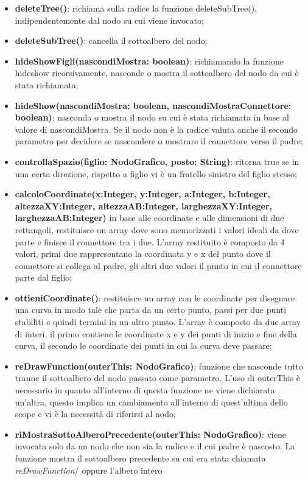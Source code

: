 \begin{itemize}
\item \textbf{deleteTree()}: richiama sulla radice la funzione deleteSubTree(), indipendentemente dal nodo su cui viene invocato;
\item \textbf{deleteSubTree()}: cancella il sottoalbero del nodo;
\item \textbf{hideShowFigli(nascondiMostra: boolean)}: richiamando la funzione hideshow ricorsivamente, nasconde o mostra il sottoalbero del nodo da cui è stata richiamata;
\item \textbf{hideShow(nascondiMostra: boolean, nascondiMostraConnettore: boolean)}: nasconda o mostra il nodo su cui è stata richiamata in base al valore di nascondiMostra. Se il nodo non è la radice valuta anche il secondo parametro per decidere se nascondere o mostrare il connettore verso il padre;
\item \textbf{controllaSpazio(figlio: NodoGrafico, posto: String)}: ritorna true se in una certa direzione, rispetto a figlio vi è un fratello sinistro del figlio stesso;
\item \textbf{calcoloCoordinate(x:Integer, y:Integer, a:Integer, b:Integer, altezzaXY:Integer, altezzaAB:Integer, larghezzaXY:Integer, larghezzaAB:Integer)} in base alle coordinate e alle dimensioni di due rettangoli, restituisce un array dove sono memorizzati i valori ideali da dove parte e finisce il connettore tra i due. L'array restituito è composto da 4 valori, primi due rappresentano la coordinata y e x del punto dove il connettore si collega al padre, gli altri due valori il punto in cui il connettore parte dal figlio;
\item \textbf{ottieniCoordinate()}: restituisce un array con le coordinate per disegnare una curva in modo tale che parta da un certo punto, passi per due punti stabiliti e quindi termini in un altro punto. L'array è composto da due array di interi, il primo contiene le coordinate x e y dei punti di inizio e fine della curva, il secondo le coordinate dei punti in cui la curva deve passare;
\item \textbf{reDrawFunction(outerThis: NodoGrafico)}: funzione che nasconde tutto tranne il sottoalbero del nodo passato come parametro. L'uso di outerThis è necessario in quanto all'interno di questa funzione ne viene dichiarata un'altra, questo implica un cambiamento all'interno di quest'ultima dello scope e vi è la necessità di riferirsi al nodo;
\item \textbf{riMostraSottoAlberoPrecedente(outerThis: NodoGrafico)}: viene invocata solo da un nodo che non sia la radice e il cui padre è nascosto. La funzione mostra il sottoalbero precedente su cui era stata chiamata \textit{reDrawFunction}/ oppure l'albero intero
\end{itemize}
